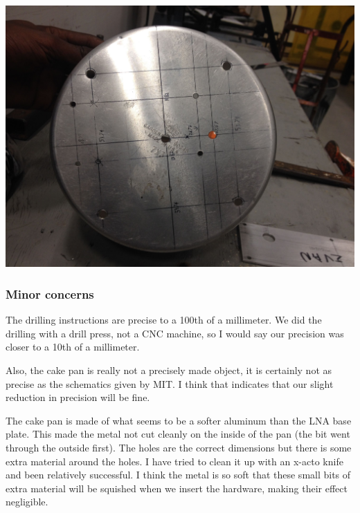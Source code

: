 \documentclass[11pt]{article} %
\begin{document}
\begin{center}
\includegraphics[scale=0.11]{feed/07.jpeg}
\end{center}

\subsubsection{Minor concerns}
The drilling instructions are precise to a 100th of a millimeter. We did the drilling with a drill press, not a CNC machine, so I would say our precision was closer to a 10th of a millimeter.

Also, the cake pan is really not a precisely made object, it is certainly not as precise as the schematics given by MIT. I think that indicates that our slight reduction in precision will be fine.

The cake pan is made of what seems to be a softer aluminum than the LNA base plate. This made the metal not cut cleanly on the inside of the pan (the bit went through the outside first). The holes are the correct dimensions but there is some extra material around the holes. I have tried to clean it up with an x-acto knife and been relatively successful. I think the metal is so soft that these small bits of extra material will be squished when we insert the hardware, making their effect negligible. 
\end{document}
